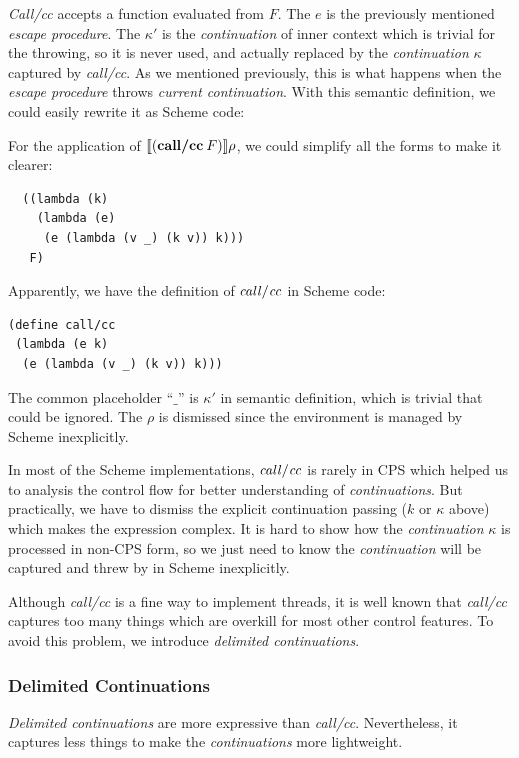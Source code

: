 \documentclass[numbers,numberedpars]{sigplanconf}
\begin{document}
{\it Call/cc} accepts a function evaluated from $F$. The $e$ is the previously mentioned {\it escape procedure}.
The $\kappa'$ is the {\it continuation} of inner context which is trivial for the throwing, so it is never used, and actually replaced
by the {\it continuation} $\kappa$ captured by {\it call/cc}. As we mentioned previously, this is what happens when the {\it escape procedure}
throws {\it current continuation}. With this semantic definition, we could easily rewrite it as Scheme code:

For the application of $\llbracket{(\text{{\bf call/cc}}\:F)}\rrbracket\rho$, we could simplify all the forms to make it clearer:
\begin{lstlisting}
  ((lambda (k)
    (lambda (e)
     (e (lambda (v _) (k v)) k)))
   F)
\end{lstlisting}

Apparently, we have the definition of ${\it call/cc}$ in Scheme code:
\begin{lstlisting}
(define call/cc
 (lambda (e k)
  (e (lambda (v _) (k v)) k)))
\end{lstlisting}

The common placeholder  ``$\_$'' is $\kappa'$ in semantic definition, which is trivial that could be ignored.
The $\rho$ is dismissed since the environment is managed by Scheme inexplicitly.

In most of the Scheme implementations, ${\it call/cc}$ is rarely in CPS which helped us to analysis the control flow for better understanding
of {\it continuations}.
But practically, we have to dismiss the explicit continuation passing ($k$ or $\kappa$ above) which makes the expression complex.
It is hard to show how the {\it continuation} $\kappa$ is processed in non-CPS form, so we just need to know the {\it continuation} will be captured and
threw by in Scheme inexplicitly.

Although {\it call/cc} is a fine way to implement threads, it is well known that {\it call/cc} captures too many things which are overkill for most
other control features. To avoid this problem, we introduce {\it delimited continuations}.

\subsubsection{Delimited Continuations} \label{Delimited Continuations}

{\it Delimited continuations} are more expressive than {\it call/cc}.
Nevertheless, it captures less things to make the {\it continuations} more lightweight.
\end{document}
